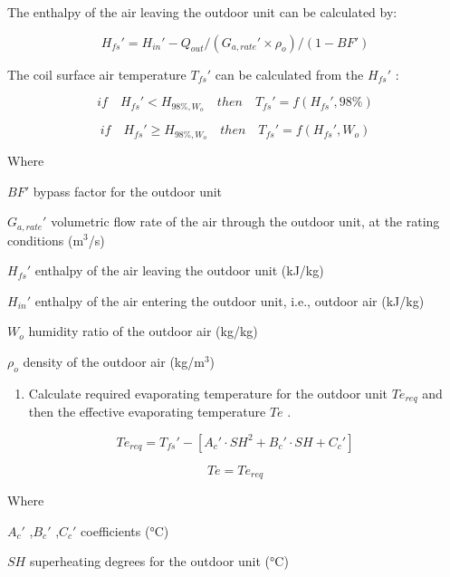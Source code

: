 The enthalpy of the air leaving the outdoor unit can be calculated by:

\begin{equation}
{H_{fs}}' = {H_{in}}'-Q_{out}/({G_{a,rate}}'\times{\rho_o})/(1-BF')
\end{equation}

The coil surface air temperature \({T_{fs}}'\) can be calculated from the \({H_{fs}}'\) :

\begin{equation}
if\quad{H_{fs}}'<H_{98\%,W_o}\quad{then}\quad{T_{fs}}' = f({H_{fs}}',98\%)
\end{equation}

\begin{equation}
if\quad{H_{fs}}'\ge{H_{98\%,W_o}}\quad{then}\quad{T_{fs}}' = f({H_{fs}}',W_o)
\end{equation}

Where

\(BF'\) bypass factor for the outdoor unit

\({G_{a,rate}}'\) volumetric flow rate of the air through the outdoor unit, at the rating conditions (m\(^{3}\)/s)

\({H_{fs}}'\) enthalpy of the air leaving the outdoor unit (kJ/kg)

\({H_{in}}'\) enthalpy of the air entering the outdoor unit, i.e., outdoor air (kJ/kg)

\(W_o\) humidity ratio of the outdoor air (kg/kg)

\(\rho_o\) density of the outdoor air (kg/m\(^{3}\))

\begin{enumerate}
\def\labelenumi{(\arabic{enumi})}
\setcounter{enumi}{1}
\tightlist
\item
  Calculate required evaporating temperature for the outdoor unit \(Te_{req}\) and then the effective evaporating temperature \(Te\) .
\end{enumerate}

\begin{equation}
Te_{req} = {T_{fs}}'-[{A_c}'\cdot SH^2+{B_c}'\cdot SH+{C_c}']
\end{equation}

\begin{equation}
Te = Te_{req}
\end{equation}

Where

\({A_c}'\) ,\({B_c}'\) ,\({C_c}'\) coefficients (°C)

\(SH\) superheating degrees for the outdoor unit (°C)


